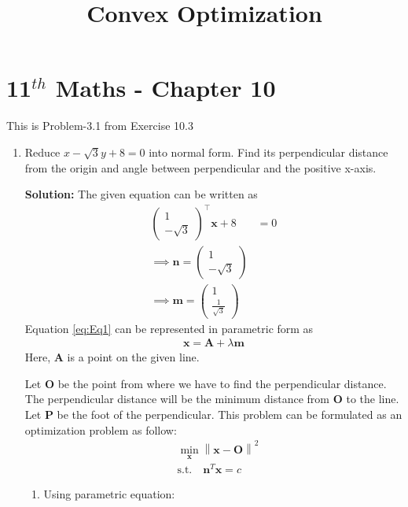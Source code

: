 \documentclass[12pt]{article}
\providecommand{\norm}[1]{\left\lVert#1\right\rVert}
\newcommand{\solution}{\noindent \textbf{Solution: }}
\newcommand{\myvec}[1]{\ensuremath{\begin{pmatrix}#1\end{pmatrix}}}
\let\vec\mathbf
\begin{document}
\begin{center}
\title{\textbf{Convex Optimization}}
\date{\vspace{-5ex}} %
\maketitle
\end{center}
\setcounter{page}{1}

\section{11$^{th}$ Maths - Chapter 10}
This is Problem-3.1 from Exercise 10.3 
\begin{enumerate}
\item Reduce $x-\sqrt{3}y+8=0$ into normal form. Find its perpendicular distance from the origin and angle between perpendicular and the positive x-axis. 

\solution 
The given equation can be written as
\begin{align}
	\label{eq:Eq1}
	\myvec{1 \\ -\sqrt{3}}^\top\vec{x}+8 &= 0 \\
	\implies \vec{n} = \myvec{1 \\ -\sqrt{3}} \\
	\implies \vec{m} = \myvec{1 \\ \frac{1}{\sqrt{3}}}
\end{align}
Equation \eqref{eq:Eq1} can be represented in parametric form as
\begin{align}
	\label{eq:Eq2}
	\vec{x} = \vec{A}+\lambda\vec{m}
\end{align}
Here, $\vec{A}$ is a point on the given line. 

Let $\vec{O}$ be the point from where we have to find the perpendicular distance. The perpendicular distance will be the minimum distance from $\vec{O}$ to the line. Let $\vec{P}$ be the foot of the perpendicular. This problem can be formulated as an optimization problem as follow:
\begin{align}
	\label{eq:Eq3}
	&  \min_{\vec{x}} \norm{\vec{x}-\vec{O}}^2\\
	& \text{s.t.} \quad \vec{n}^T\vec{x} = c 
\end{align}
\begin{enumerate}
\item Using parametric equation:


\end{enumerate}
\end{enumerate}
\end{document}
